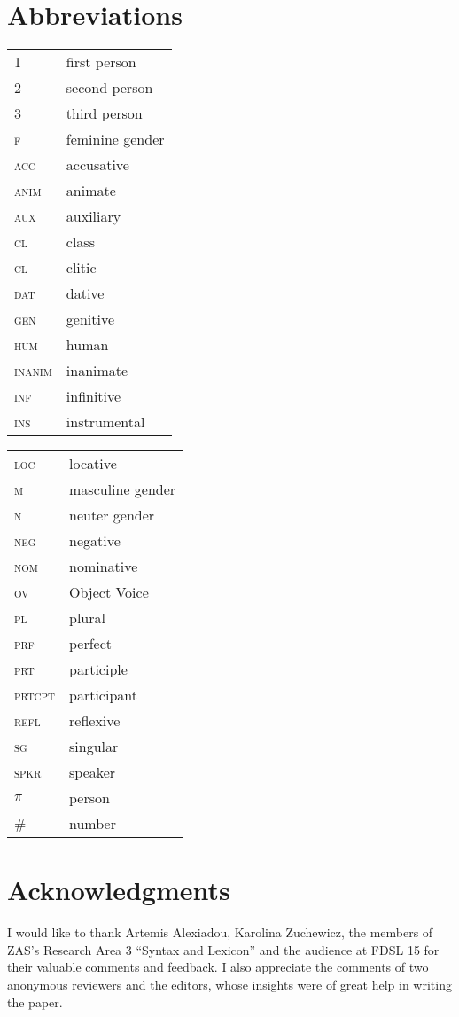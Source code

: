 \documentclass[output=paper,colorlinks,citecolor=brown]{langscibook}
\begin{document}
\section*{Abbreviations}



\begin{tabularx}{.45\textwidth}{@{}lQ}
\textsc{1}&first person\\
\textsc{2}&second person\\
\textsc{3}&third person\\
\textsc{f}&feminine gender\\
\textsc{acc}&accusative\\
\textsc{anim}&animate\\
\textsc{aux}&auxiliary\\
\textsc{cl}&class \\
\textsc{cl}&clitic\\
\textsc{dat}&dative\\
\textsc{gen}&genitive\\
\textsc{hum}&human \\
\textsc{inanim}&inanimate\\
\textsc{inf}&infinitive\\
\textsc{ins}&instrumental\\
\end{tabularx}
\begin{tabularx}{.45\textwidth}{@{}lQ}
\textsc{loc}&locative\\
\textsc{m}&masculine gender \\
\textsc{n}&neuter gender \\
\textsc{neg}&negative\\
\textsc{nom}&nominative\\
\textsc{ov}& Object Voice\\
\textsc{pl}&plural\\
\textsc{prf}&perfect\\
\textsc{prt}&participle\\
\textsc{prtcpt}&participant\\
\textsc{refl}&reflexive \\
\textsc{sg}&singular \\
\textsc{spkr}&speaker\\
$\pi$&person\\
\#&number \\
\end{tabularx}

\section*{Acknowledgments}
I would like to thank Artemis Alexiadou, Karolina Zuchewicz, the members of ZAS's Research Area 3 ``Syntax and Lexicon'' and the audience at FDSL 15 for their valuable comments and feedback. I also appreciate the comments of two anonymous reviewers and the editors, whose insights were of great help in writing the paper.    

\printbibliography[heading=subbibliography,notkeyword=this]
\end{document}
